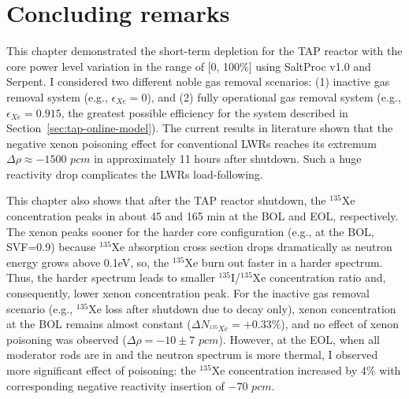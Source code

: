 \section{Concluding remarks}
This chapter demonstrated the short-term depletion for the \gls{TAP} reactor
with the core power level variation in the range of [0, 100\%] using SaltProc 
v1.0 and Serpent. I considered two different noble gas removal scenarios: (1) 
inactive gas removal system (e.g., $\epsilon_{Xe}=0$), and (2) fully 
operational gas removal system (e.g., $\epsilon_{Xe}=0.915$, the greatest 
possible efficiency for the system described in 
Section~\ref{sec:tap-online-model}). The current results in literature shown 
that the negative xenon poisoning effect for conventional \glspl{LWR} reaches 
its extremum $\Delta\rho\approx-1500$ $pcm$ in approximately 11 hours after 
shutdown. Such a huge reactivity drop complicates the \glspl{LWR} 
load-following.

This chapter also shows that after the \gls{TAP} reactor shutdown, the 
$^{135}$Xe concentration peaks in about 45 and 165 min at the \gls{BOL} and 
\gls{EOL}, respectively. The xenon peaks sooner for the harder core 
configuration (e.g., at the \gls{BOL}, SVF=0.9) because $^{135}$Xe absorption 
cross section drops dramatically as neutron energy grows above 0.1eV, so, the 
$^{135}$Xe burn out faster in a harder spectrum. Thus, the harder spectrum 
leads to smaller $^{135}$I/$^{135}$Xe concentration ratio and, consequently, 
lower xenon concentration peak. For the inactive gas removal scenario (e.g., 
$^{135}$Xe loss after shutdown due to decay only), xenon concentration at the 
\gls{BOL} remains almost constant ($\Delta N_{^{135}Xe}=+0.33$\%), and no 
effect of xenon poisoning was observed ($\Delta\rho=-10\pm7$ $pcm$). However, 
at the \gls{EOL}, when all moderator rods are in and the neutron spectrum is 
more thermal, I observed more significant effect of poisoning: the $^{135}$Xe 
concentration increased by 4\% with corresponding negative reactivity 
insertion of $-70$ $pcm$. 

